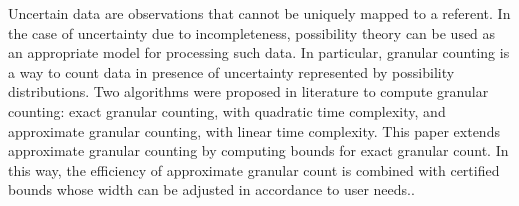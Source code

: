 
Uncertain data are observations that cannot be uniquely mapped to
a referent. In the case of uncertainty due to incompleteness, possibility
theory can be used as an appropriate model for processing such data.
In particular, granular counting is a way to count data in presence
of uncertainty represented by possibility distributions. Two algorithms
were proposed in literature to compute granular counting: exact granular
counting, with quadratic time complexity, and approximate granular
counting, with linear time complexity. This paper extends approximate
granular counting by computing bounds for exact granular count. In
this way, the efficiency of approximate granular count is combined
with certified bounds whose width can be adjusted in accordance to
user needs..

